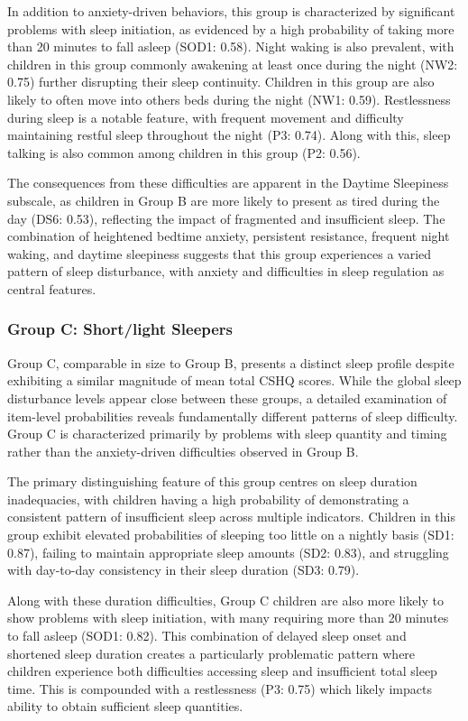 \documentclass[11pt]{article}
\theoremstyle{plain}
\theoremstyle{definition}
\begin{document}
In addition to anxiety-driven behaviors, this group is characterized by significant problems with sleep initiation, as evidenced by a high probability of taking more than 20 minutes to fall asleep (SOD1: 0.58). Night waking is also prevalent, with children in this group commonly awakening at least once during the night (NW2: 0.75) further disrupting their sleep continuity. Children in this group are also likely to often move into others beds during the night (NW1: 0.59). Restlessness during sleep is a notable feature, with frequent movement and difficulty maintaining restful sleep throughout the night (P3: 0.74). Along with this, sleep talking is also common among children in this group (P2: 0.56).

 The consequences from these difficulties are apparent in the Daytime Sleepiness subscale, as children in Group B are more likely to present as tired during the day (DS6: 0.53), reflecting the impact of fragmented and insufficient sleep. The combination of heightened bedtime anxiety, persistent resistance, frequent night waking, and daytime sleepiness suggests that this group experiences a varied pattern of sleep disturbance, with anxiety and difficulties in sleep regulation as central features.
\subsubsection{Group C: Short/light Sleepers} 
Group C, comparable in size to Group B, presents a distinct sleep profile despite exhibiting a similar magnitude of mean total CSHQ scores. While the global sleep disturbance levels appear close between these groups, a detailed examination of item-level probabilities reveals fundamentally different patterns of sleep difficulty. Group C is characterized primarily by problems with sleep quantity and timing rather than the anxiety-driven difficulties observed in Group B.

The primary distinguishing feature of this group centres on sleep duration inadequacies, with children having a high probability of demonstrating a consistent pattern of insufficient sleep across multiple indicators. Children in this group exhibit elevated probabilities of sleeping too little on a nightly basis (SD1: 0.87), failing to maintain appropriate sleep amounts (SD2: 0.83), and struggling with day-to-day consistency in their sleep duration (SD3: 0.79).

Along with these duration difficulties, Group C children are also more likely to show problems with sleep initiation, with many requiring more than 20 minutes to fall asleep (SOD1: 0.82). This combination of delayed sleep onset and shortened sleep duration creates a particularly problematic pattern where children experience both difficulties accessing sleep and insufficient total sleep time. This is compounded with a restlessness (P3: 0.75) which likely impacts ability to obtain sufficient sleep quantities.
\end{document}

